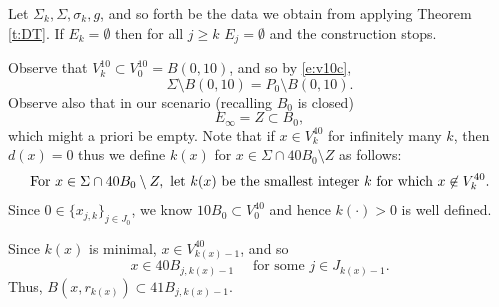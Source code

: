 \documentclass[11pt]{amsart}
\theoremstyle{definition}
\theoremstyle{remark}
\numberwithin{equation}{section}
\begin{document}
Let $\Sigma_{k},\Sigma,\sigma_{k},g$, and so forth be the data we obtain from applying Theorem \ref{t:DT}. 
If $E_k=\emptyset$ then for all $j\ge k$ $E_j=\emptyset$ and the construction stops.


Observe that $V_{k}^{10}\subset V_{0}^{10}= B(0,10)$, and so by \eqref{e:v10c},
\begin{equation}\label{e:planar-sigma}
\Sigma\setminus B(0,10)=P_{0}\setminus B(0,10).
\end{equation}
Observe also  that in our scenario (recalling $B_0$ is closed)
\begin{equation}\label{e-infty=z}
E_{\infty} = Z\subset  B_0,
\end{equation}
which might a priori be empty.
Note that if $x\in V_{k}^{40}$ for infinitely many $k$, then $d(x)=0$ thus we define $k(x)$ for $x\in \Sigma\cap 40B_{0}\setminus Z$ as follows:
\begin{align}\label{k(x)}
\hbox{For }x\in \Sigma\cap 40B_{0}\setminus Z,\hbox{ let }k(x)\hbox{ be the smallest integer }k\hbox{ for which }x\not\in V_{k}^{40}. 
 \end{align}
Since $0\in \{x_{j,k} \}_{j\in J_{0}}$, we know $10B_{0}\subset V_{0}^{40}$ and hence $k(\cdot)>0 $ is well defined. 
 
Since $k(x)$ is minimal, $x\in V_{k(x)-1}^{40}$, and so 
\begin{equation}
\label{e:ing99}
x\in 40 B_{j,k(x)-1}\quad\mbox{ for some $j\in J_{ k(x)-1}$.}
\end{equation}
 Thus, $B(x,r_{k(x)})\subset 41 B_{j,k(x)-1}$. 
\end{document}
